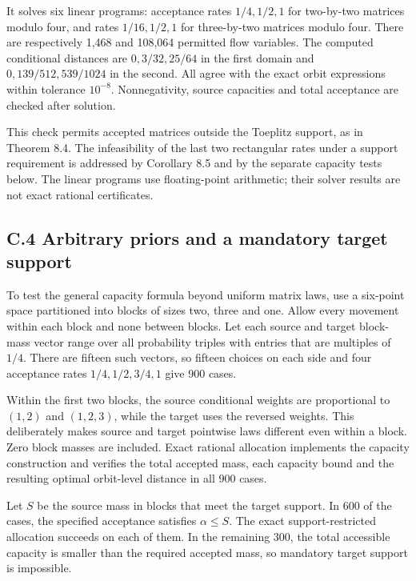 \documentclass[
]{article}
\begin{document}
It solves six linear programs: acceptance rates \(1/4,1/2,1\) for
two-by-two matrices modulo four, and rates \(1/16,1/2,1\) for
three-by-two matrices modulo four. There are respectively 1,468 and
108,064 permitted flow variables. The computed conditional distances are
\(0,3/32,25/64\) in the first domain and \(0,139/512,539/1024\) in the
second. All agree with the exact orbit expressions within tolerance
\(10^{-8}\). Nonnegativity, source capacities and total acceptance are
checked after solution.

This check permits accepted matrices outside the Toeplitz support, as in
Theorem 8.4. The infeasibility of the last two rectangular rates under a
support requirement is addressed by Corollary 8.5 and by the separate
capacity tests below. The linear programs use floating-point arithmetic;
their solver results are not exact rational certificates.

\subsection{C.4 Arbitrary priors and a mandatory target
support}\label{c.4-arbitrary-priors-and-a-mandatory-target-support}

To test the general capacity formula beyond uniform matrix laws, use a
six-point space partitioned into blocks of sizes two, three and one.
Allow every movement within each block and none between blocks. Let each
source and target block-mass vector range over all probability triples
with entries that are multiples of \(1/4\). There are fifteen such
vectors, so fifteen choices on each side and four acceptance rates
\(1/4,1/2,3/4,1\) give 900 cases.

Within the first two blocks, the source conditional weights are
proportional to \((1,2)\) and \((1,2,3)\), while the target uses the
reversed weights. This deliberately makes source and target pointwise
laws different even within a block. Zero block masses are included.
Exact rational allocation implements the capacity construction and
verifies the total accepted mass, each capacity bound and the resulting
optimal orbit-level distance in all 900 cases.

Let \(S\) be the source mass in blocks that meet the target support. In
600 of the cases, the specified acceptance satisfies \(\alpha\le S\).
The exact support-restricted allocation succeeds on each of them. In the
remaining 300, the total accessible capacity is smaller than the
required accepted mass, so mandatory target support is impossible.
\end{document}
